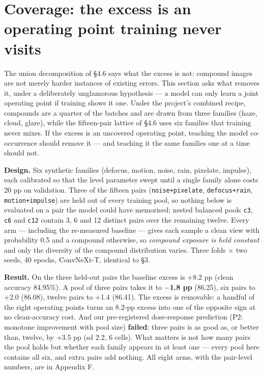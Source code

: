 \section{Coverage: the excess is an operating point training never visits}
The union decomposition of §4.6 says what the excess is not: compound images are not merely harder instances of existing errors. This section asks what removes it, under a deliberately unglamorous hypothesis --- a model can only learn a joint operating point if training shows it one. Under the project's combined recipe, compounds are a quarter of the batches and are drawn from three families (haze, cloud, glare), while the fifteen-pair lattice of §4.6 uses six families that training never mixes. If the excess is an uncovered operating point, teaching the model co-occurrence should remove it --- and teaching it the same families one at a time should not.

\textbf{Design.} Six synthetic families (defocus, motion, noise, rain, pixelate, impulse), each calibrated so that the level parameter swept until a single family alone costs 20 pp on validation. Three of the fifteen pairs (\texttt{noise+pixelate}, \texttt{defocus+rain}, \texttt{motion+impulse}) are held out of every training pool, so nothing below is evaluated on a pair the model could have memorised; nested balanced pools \texttt{c3}, \texttt{c6} and \texttt{c12} contain 3, 6 and 12 distinct pairs over the remaining twelve. Every arm --- including the re-measured baseline --- gives each sample a clean view with probability 0.5 and a compound otherwise, so \emph{compound exposure is held constant} and only the diversity of the compound distribution varies. Three folds $\times$ two seeds, 40 epochs, ConvNeXt-T, identical to §3.

\textbf{Result.} On the three held-out pairs the baseline excess is +8.2 pp (clean accuracy 84.95\%). A pool of three pairs takes it to \textbf{$-$1.8 pp} (86.25), six pairs to +2.0 (86.08), twelve pairs to +1.4 (86.41). The excess is removable: a handful of the right operating points turns an 8.2-pp excess into one of the opposite sign at no clean-accuracy cost. And our pre-registered dose-response prediction (P2: monotone improvement with pool size) \textbf{failed}: three pairs is as good as, or better than, twelve, by +3.5 pp (sd 2.2, 6 cells). What matters is not how many pairs the pool holds but whether each family appears in at least one --- every pool here contains all six, and extra pairs add nothing. All eight arms, with the pair-level numbers, are in Appendix F.

